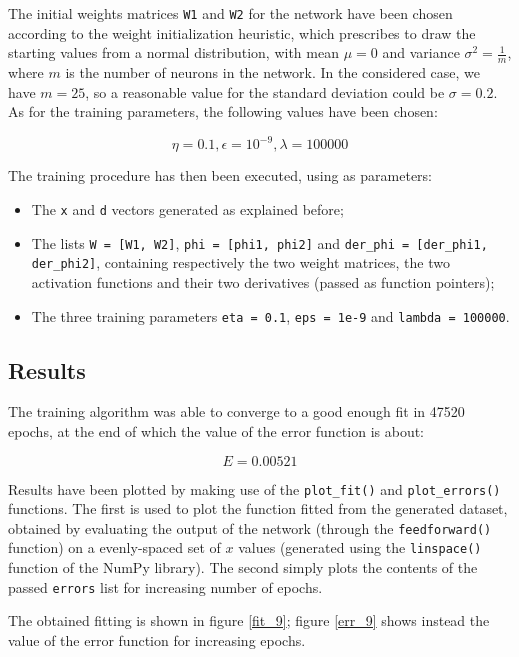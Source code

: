 \documentclass[letterpaper,headings=standardclasses]{scrartcl}
\begin{document}
The initial weights matrices \texttt{W1} and \texttt{W2} for the network have been chosen according to the weight initialization heuristic, which prescribes to draw the starting values from a normal distribution, with mean $\mu = 0$ and variance $\sigma^2 = \frac{1}{m}$, where $m$ is the number of neurons in the network. In the considered case, we have $m = 25$, so a reasonable value for the standard deviation could be $\sigma = 0.2$. As for the training parameters, the following values have been chosen:

$$ \eta = 0.1, \epsilon = 10^{-9}, \lambda = 100000 $$

The training procedure has then been executed, using as parameters:

\begin{itemize}
    \item The \texttt{x} and \texttt{d} vectors generated as explained before;
    \item The lists \texttt{W = [W1, W2]}, \texttt{phi = [phi1, phi2]} and \texttt{der\_phi = [der\_phi1, der\_phi2]}, containing respectively the two weight matrices, the two activation functions and their two derivatives (passed as function pointers);
    \item The three training parameters \texttt{eta = 0.1}, \texttt{eps = 1e-9} and \texttt{lambda = 100000}.
\end{itemize}

\subsection{Results}

The training algorithm was able to converge to a good enough fit in 47520 epochs, at the end of which the value of the error function is about:

$$ E = 0.00521 $$

Results have been plotted by making use of the \texttt{plot\_fit()} and \texttt{plot\_errors()} functions. The first is used to plot the function fitted from the generated dataset, obtained by evaluating the output of the network (through the \texttt{feedforward()} function) on a evenly-spaced set of $x$ values (generated using the \texttt{linspace()} function of the NumPy library). The second simply plots the contents of the passed \texttt{errors} list for increasing number of epochs.

The obtained fitting is shown in figure \ref{fit_9}; figure \ref{err_9} shows instead the value of the error function for increasing epochs.
\end{document}
